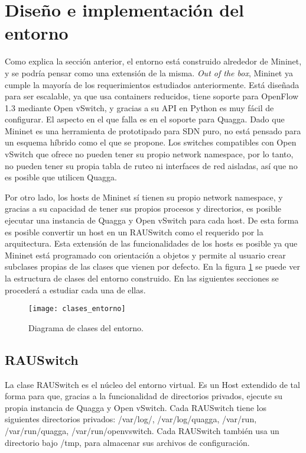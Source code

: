 \section{Diseño e implementación del entorno}
Como explica la sección anterior, el entorno está construido alrededor de Mininet, y se podría pensar como una extensión de la misma. \textit{Out of the box}, Mininet ya cumple la mayoría de los requerimientos estudiados anteriormente. Está diseñada para ser escalable, ya que usa containers reducidos, tiene soporte para OpenFlow 1.3 mediante Open vSwitch, y gracias a su API en Python es muy fácil de configurar. El aspecto en el que falla es en el soporte para Quagga. Dado que Mininet es una herramienta de prototipado para SDN puro, no está pensado para un esquema híbrido como el que se propone. Los switches compatibles con Open vSwitch que ofrece no pueden tener su propio network namespace, por lo tanto, no pueden tener su propia tabla de ruteo ni interfaces de red aisladas, así que no es posible que utilicen Quagga.

Por otro lado, los hosts de Mininet sí tienen su propio network namespace, y gracias a su capacidad de tener sus propios procesos y directorios, es posible ejecutar una instancia de Quagga y Open vSwitch para cada host. De esta forma es posible convertir un host en un RAUSwitch como el requerido por la arquitectura. Esta extensión de las funcionalidades de los hosts es posible ya que Mininet está programado con orientación a objetos y permite al usuario crear subclases propias de las clases que vienen por defecto. En la figura \ref{fig:clases_entorno} se puede ver la estructura de clases del entorno construido. En las siguientes secciones se procederá a estudiar cada una de ellas.

\begin{figure}[t]
	\caption{Diagrama de clases del entorno.}
	\texttt{[image: clases\_entorno]}
	\centering
	\label{fig:clases_entorno}
\end{figure}

\subsection{RAUSwitch}
La clase RAUSwitch es el núcleo del entorno virtual. Es un Host extendido de tal forma para que, gracias a la funcionalidad de directorios privados, ejecute su propia instancia de Quagga y Open vSwitch. Cada RAUSwitch tiene los siguientes directorios privados: /var/log/, /var/log/quagga, /var/run, /var/run/quagga, /var/run/openvswitch. Cada RAUSwitch también usa un directorio bajo /tmp, para almacenar sus archivos de configuración.

